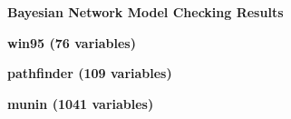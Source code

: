 \documentclass[a4paper,8pt]{article}
\begin{document}
\begin{center}
\Large \textbf{Bayesian Network Model Checking Results}
\end{center}

\vspace{0.3cm}

\noindent
\textbf{\large win95 (76 variables)}




\vspace{0.5cm}

\noindent
\textbf{\large pathfinder (109 variables)}




\vspace{0.5cm}

\noindent
\textbf{\large munin (1041 variables)}




\vspace{0.5cm}

\end{document}
